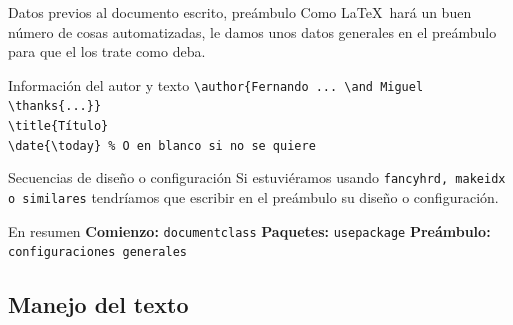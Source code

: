 \documentclass[12pt]{beamer}
\begin{document}
\begin{frame}[fragile]{Datos previos al documento escrito, preámbulo}
Como \LaTeX\ hará un buen número de cosas automatizadas, le damos unos datos generales en el preámbulo para que el los trate como deba.
\begin{block}{Información del autor y texto}
	\verb|\author{Fernando ... \and Miguel \thanks{...}}| \\
	\verb|\title{Título}| \\
	\verb|\date{\today} % O en blanco si no se quiere|
\end{block}
\begin{block}{Secuencias de diseño o configuración}
	Si estuviéramos usando \texttt{fancyhrd, makeidx o similares} tendríamos que escribir en el preámbulo su diseño o configuración.
\end{block}
\end{frame}

\begin{frame}{En resumen}
	\textbf{Comienzo:} \texttt{documentclass}
	\vfill
	\textbf{Paquetes:} \texttt{usepackage}
	\vfill
	\textbf{Preámbulo:} \texttt{configuraciones generales}
\end{frame}

\subsection{Manejo del texto}
\end{document}
